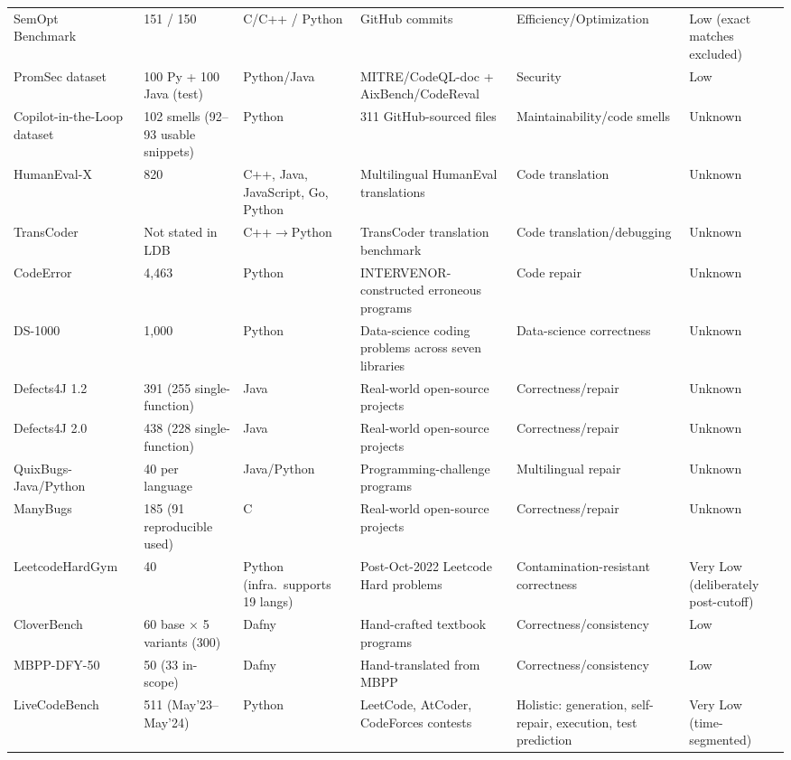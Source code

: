 \documentclass[10pt,a4paper]{article}
\begin{document}
\begin{table}[p]
\begin{tabularx}{\textwidth}{@{}p{92pt}p{55pt}p{70pt}p{105pt}X p{62pt}@{}}
SemOpt Benchmark~\cite{zhao2025semopt} & 151 / 150 & C/C++ / Python & GitHub commits & Efficiency/Optimization & Low (exact matches excluded) \\
PromSec dataset~\cite{nazzal2024promsec} & 100 Py + 100 Java (test) & Python/Java & MITRE/CodeQL-doc + AixBench/CodeReval & Security & Low \\
Copilot-in-the-Loop dataset~\cite{zhang2024copilot} & 102 smells (92--93 usable snippets) & Python & 311 GitHub-sourced files & Maintainability/code smells & Unknown \\
HumanEval-X~\cite{wang2024intervenor} & 820 & C++, Java, JavaScript, Go, Python & Multilingual HumanEval translations & Code translation & Unknown \\
TransCoder~\cite{zhong2024ldb} & Not stated in LDB & C++$\rightarrow$Python & TransCoder translation benchmark & Code translation/debugging & Unknown \\
CodeError~\cite{wang2024intervenor} & 4{,}463 & Python & INTERVENOR-constructed erroneous programs & Code repair & Unknown \\
DS-1000~\cite{wang2024intervenor} & 1{,}000 & Python & Data-science coding problems across seven libraries & Data-science correctness & Unknown \\
Defects4J 1.2~\cite{xia2023apr} & 391 (255 single-function) & Java & Real-world open-source projects & Correctness/repair & Unknown \\
Defects4J 2.0~\cite{xia2023apr} & 438 (228 single-function) & Java & Real-world open-source projects & Correctness/repair & Unknown \\
QuixBugs-Java/Python~\cite{xia2023apr} & 40 per language & Java/Python & Programming-challenge programs & Multilingual repair & Unknown \\
ManyBugs~\cite{xia2023apr} & 185 (91 reproducible used) & C & Real-world open-source projects & Correctness/repair & Unknown \\
LeetcodeHardGym~\cite{shinn2023} & 40 & Python (infra.\ supports 19 langs) & Post-Oct-2022 Leetcode Hard problems & Contamination-resistant correctness & Very Low (deliberately post-cutoff) \\
CloverBench~\cite{sun2024clover} & 60 base $\times$ 5 variants (300) & Dafny & Hand-crafted textbook programs & Correctness/consistency & Low \\
MBPP-DFY-50~\cite{sun2024clover} & 50 (33 in-scope) & Dafny & Hand-translated from MBPP & Correctness/consistency & Low \\
LiveCodeBench~\cite{jain2024} & 511 (May'23--May'24) & Python & LeetCode, AtCoder, CodeForces contests & Holistic: generation, self-repair, execution, test prediction & Very Low (time-segmented) \\

\end{tabularx}
\end{table}
\end{document}
